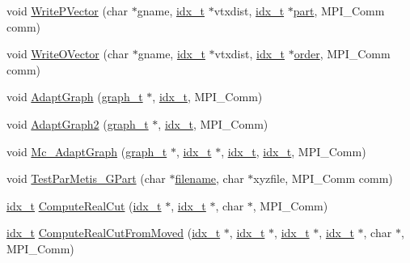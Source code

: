 \begin{DoxyCompactItemize}
\item 
void \hyperlink{a00954_a19b5376612558b2381990f2e7a06bffc}{Write\+P\+Vector} (char $\ast$gname, \hyperlink{a00876_aaa5262be3e700770163401acb0150f52}{idx\+\_\+t} $\ast$vtxdist, \hyperlink{a00876_aaa5262be3e700770163401acb0150f52}{idx\+\_\+t} $\ast$\hyperlink{a00879_a0a9ea8670f88d6db1e021fee2dcd94be}{part}, M\+P\+I\+\_\+\+Comm comm)
\item 
void \hyperlink{a00954_a9ff4864d8e906761bd6c55597c085e3b}{Write\+O\+Vector} (char $\ast$gname, \hyperlink{a00876_aaa5262be3e700770163401acb0150f52}{idx\+\_\+t} $\ast$vtxdist, \hyperlink{a00876_aaa5262be3e700770163401acb0150f52}{idx\+\_\+t} $\ast$\hyperlink{a00611_aab21ede0c02820806e77fd7890ee6bd7}{order}, M\+P\+I\+\_\+\+Comm comm)
\item 
void \hyperlink{a00954_a6ff2574c60e68baf64eeab1b37f73cdf}{Adapt\+Graph} (\hyperlink{a00734}{graph\+\_\+t} $\ast$, \hyperlink{a00876_aaa5262be3e700770163401acb0150f52}{idx\+\_\+t}, M\+P\+I\+\_\+\+Comm)
\item 
void \hyperlink{a00954_a0b7f332d1e5baf2185e681dbb12787b3}{Adapt\+Graph2} (\hyperlink{a00734}{graph\+\_\+t} $\ast$, \hyperlink{a00876_aaa5262be3e700770163401acb0150f52}{idx\+\_\+t}, M\+P\+I\+\_\+\+Comm)
\item 
void \hyperlink{a00954_a6f07f5a19ed9d8794b6061542aa6015b}{Mc\+\_\+\+Adapt\+Graph} (\hyperlink{a00734}{graph\+\_\+t} $\ast$, \hyperlink{a00876_aaa5262be3e700770163401acb0150f52}{idx\+\_\+t} $\ast$, \hyperlink{a00876_aaa5262be3e700770163401acb0150f52}{idx\+\_\+t}, \hyperlink{a00876_aaa5262be3e700770163401acb0150f52}{idx\+\_\+t}, M\+P\+I\+\_\+\+Comm)
\item 
void \hyperlink{a00954_adb0c2dc0c5138f35c71739328c702074}{Test\+Par\+Metis\+\_\+\+G\+Part} (char $\ast$\hyperlink{a00623_a42a21beb8018ac623f4d09db1343b9cf}{filename}, char $\ast$xyzfile, M\+P\+I\+\_\+\+Comm comm)
\item 
\hyperlink{a00876_aaa5262be3e700770163401acb0150f52}{idx\+\_\+t} \hyperlink{a00954_ae14ac8abf0f0bad98a84d811ae23cf7a}{Compute\+Real\+Cut} (\hyperlink{a00876_aaa5262be3e700770163401acb0150f52}{idx\+\_\+t} $\ast$, \hyperlink{a00876_aaa5262be3e700770163401acb0150f52}{idx\+\_\+t} $\ast$, char $\ast$, M\+P\+I\+\_\+\+Comm)
\item 
\hyperlink{a00876_aaa5262be3e700770163401acb0150f52}{idx\+\_\+t} \hyperlink{a00954_a5e1fe783f0bb3f52b2996b256900bfff}{Compute\+Real\+Cut\+From\+Moved} (\hyperlink{a00876_aaa5262be3e700770163401acb0150f52}{idx\+\_\+t} $\ast$, \hyperlink{a00876_aaa5262be3e700770163401acb0150f52}{idx\+\_\+t} $\ast$, \hyperlink{a00876_aaa5262be3e700770163401acb0150f52}{idx\+\_\+t} $\ast$, \hyperlink{a00876_aaa5262be3e700770163401acb0150f52}{idx\+\_\+t} $\ast$, char $\ast$, M\+P\+I\+\_\+\+Comm)

\end{DoxyCompactItemize}
